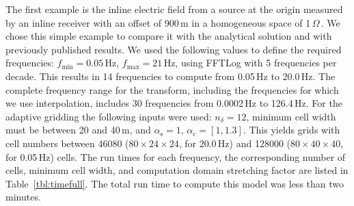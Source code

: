 \documentclass[extra, camera,%
    onecolumn,   %
    referee,     %
]{gji}
\newcommand{\mr}[1]{\mathrm{#1}}
\newcommand{\ohmm}{\ensuremath{\Omega\,}\text{m}\xspace}
\begin{document}
The first example is the inline electric field from a source at the origin
measured by an inline receiver with an offset of 900\,m in a homogeneous space
of 1\,\ohmm. We chose this simple example to compare it with the analytical
solution and with previously published results. We used the following values to
define the required frequencies: $f_\mr{min}=0.05\,$Hz, $f_\mr{max}=21\,$Hz,
using FFTLog with 5 frequencies per decade. This results in 14 frequencies to
compute from 0.05\,Hz to 20.0\,Hz. The complete frequency range for the
transform, including the frequencies for which we use interpolation, includes
30 frequencies from 0.0002\,Hz to 126.4\,Hz. For the adaptive gridding the
following inputs were used: $n_\delta=12$, minimum cell width must be between
20 and 40\,m, and $\alpha_\mr{s}=1$, $\alpha_\mr{c}=[1,1.3]$. This yields grids
with cell numbers between \num{46080} ($80\times24\times24$, for 20.0\,Hz) and
\num{128000} ($80\times40\times40$, for 0.05\,Hz) cells. The run times for each
frequency, the corresponding number of cells, minimum cell width, and
computation domain stretching factor are listed in Table~\ref{tbl:timefull}.
The total run time to compute this model was less than two minutes.
%
\end{document}
